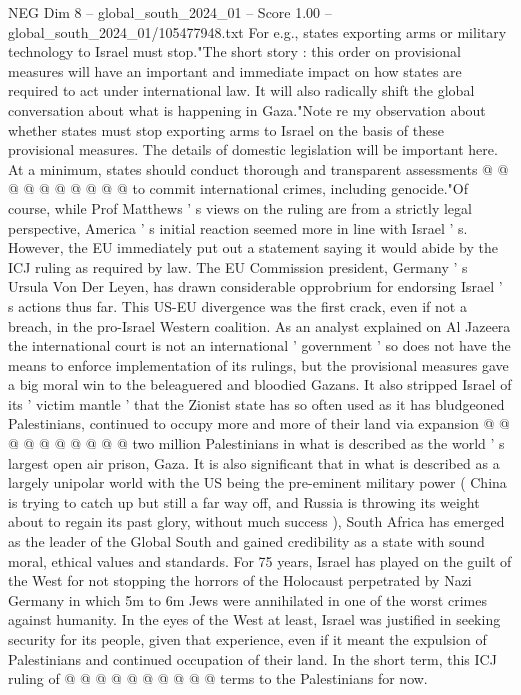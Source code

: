 \begin{textsample}{NEG Dim 8 – global\_south\_2024\_01 – Score 1.00 – global\_south\_2024\_01/105477948.txt}
For e.g., states exporting arms or military technology to Israel must stop."The short story : this order on provisional measures will have an important and immediate impact on how states are required to act under international law.
It will also radically shift the global conversation about what is happening in Gaza."Note re my observation about whether states must stop exporting arms to Israel on the basis of these provisional measures.
The details of domestic legislation will be important here.
At a minimum, states should conduct thorough and transparent assessments @ @ @ @ @ @ @ @ @ @ to commit international crimes, including genocide."Of course, while Prof Matthews ' s views on the ruling are from a strictly legal perspective, America ' s initial reaction seemed more in line with Israel ' s.
However, the EU immediately put out a statement saying it would abide by the ICJ ruling as required by law.
The EU Commission president, Germany ' s Ursula Von Der Leyen, has drawn considerable opprobrium for endorsing Israel ' s actions thus far.
This US-EU divergence was the first crack, even if not a breach, in the pro-Israel Western coalition.
As an analyst explained on Al Jazeera the international court is not an international ' government ' so does not have the means to enforce implementation of its rulings, but the provisional measures gave a big moral win to the beleaguered and bloodied Gazans.
It also stripped Israel of its ' victim mantle ' that the Zionist state has so often used as it has bludgeoned Palestinians, continued to occupy more and more of their land via expansion @ @ @ @ @ @ @ @ @ @ two million Palestinians in what is described as the world ' s largest open air prison, Gaza.
It is also significant that in what is described as a largely unipolar world with the US being the pre-eminent military power ( China is trying to catch up but still a far way off, and Russia is throwing its weight about to regain its past glory, without much success ), South Africa has emerged as the leader of the Global South and gained credibility as a state with sound moral, ethical values and standards.
For 75 years, Israel has played on the guilt of the West for not stopping the horrors of the Holocaust perpetrated by Nazi Germany in which 5m to 6m Jews were annihilated in one of the worst crimes against humanity.
In the eyes of the West at least, Israel was justified in seeking security for its people, given that experience, even if it meant the expulsion of Palestinians and continued occupation of their land.
In the short term, this ICJ ruling of @ @ @ @ @ @ @ @ @ @ terms to the Palestinians for now.

\end{textsample}
